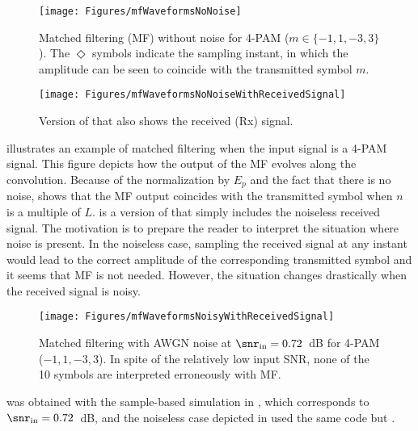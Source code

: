 \begin{figure}[htbp]
\centering
\texttt{[image: Figures/mfWaveformsNoNoise]}
\caption[{Matched filtering (MF) without noise for 4-PAM ($m \in \{-1,1,-3,3\}$).}]{Matched filtering (MF) without noise for 4-PAM ($m \in \{-1,1,-3,3\}$). The $\Diamond$ symbols indicate the sampling instant, in which the amplitude can be seen to coincide with the transmitted symbol $m$.\label{fig:mfWaveformsNoNoise}}
\end{figure}

\begin{figure}[htbp]
\centering
\texttt{[image: Figures/mfWaveformsNoNoiseWithReceivedSignal]}
\caption{Version of  that also shows the received (Rx) signal.\label{fig:mfWaveformsNoNoiseWithReceivedSignal}}
\end{figure}

 illustrates an example of matched filtering when the input signal is a 4-PAM signal. This figure depicts how the output of the MF evolves along the convolution. Because of the normalization by $E_p$ and the fact that there is no noise,  shows that the MF output coincides with the transmitted symbol when $n$ is a multiple of $L$.  is a version of  that simply includes the noiseless received signal. The motivation is to prepare the reader to interpret the situation where noise is present. In the noiseless case, sampling the received signal at any instant would lead to the correct amplitude of the corresponding transmitted symbol and it seems that MF is not needed. However, the situation changes drastically when the received signal is noisy.

\begin{figure}[htbp]
\centering
\texttt{[image: Figures/mfWaveformsNoisyWithReceivedSignal]}
\caption[{Matched filtering with AWGN noise at $\snr_{\textrm{in}}=0.72$~dB for 4-PAM ($-1,1,-3,3$).}]{Matched filtering with AWGN noise at $\snr_{\textrm{in}}=0.72$~dB for 4-PAM ($-1,1,-3,3$). In spite of the relatively low input SNR, none of the 10 symbols are interpreted erroneously with MF.\label{fig:mfWaveformsNoisyWithReceivedSignal}}
\end{figure}

 was obtained with the sample-based simulation in , which corresponds to $\snr_{\textrm{in}}=0.72$~dB, and the noiseless case depicted in  used the same code but .

